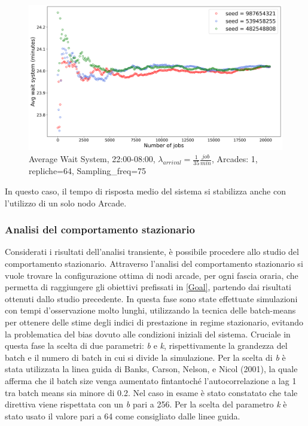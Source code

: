 \documentclass{article}
\begin{document}
\begin{figure}[H]
\centering
\captionsetup{justification=centering,margin=2cm}
\includegraphics[scale=0.48]{images/transient_night_s.png}
\caption{Average Wait System, 22:00-08:00, $\lambda_{arrival}=\frac{1}{35} \frac{job}{min}$, Arcades: 1, repliche=64, Sampling\_freq=75}\label{figura:avg_ws_night_s}
\end{figure}

In questo caso, il tempo di risposta medio del sistema si stabilizza anche con l'utilizzo di un solo nodo Arcade.

\subsubsection{Analisi del comportamento stazionario}
Considerati i risultati dell'analisi transiente, è possibile procedere allo studio del comportamento stazionario.
Attraverso l'analisi del comportamento stazionario si vuole trovare la configurazione ottima di nodi arcade, per ogni fascia oraria, che permetta di raggiungere gli obiettivi prefissati in \ref{Goal}, partendo dai risultati ottenuti dallo studio precedente.
In questa fase sono state effettuate simulazioni con tempi
d’osservazione molto lunghi, utilizzando la tecnica delle batch-means per ottenere delle stime degli indici di prestazione in regime stazionario, evitando la problematica del bias dovuto alle condizioni iniziali del sistema. Cruciale in questa fase la scelta di due parametri: \textit{b} e \textit{k}, rispettivamente la grandezza del batch e il numero di batch in cui si divide la simulazione. Per la scelta di \textit{b} è stata utilizzata la linea guida di Banks, Carson, Nelson, e Nicol (2001), la quale afferma che il batch size venga aumentato fintantoché l'autocorrelazione a lag 1 tra batch means sia minore di 0.2. Nel caso in esame è stato constatato che tale direttiva viene rispettata con un \textit{b} pari a 256. 
Per la scelta del parametro \textit{k} è stato usato il valore pari a 64 come consigliato dalle linee guida.
\end{document}
